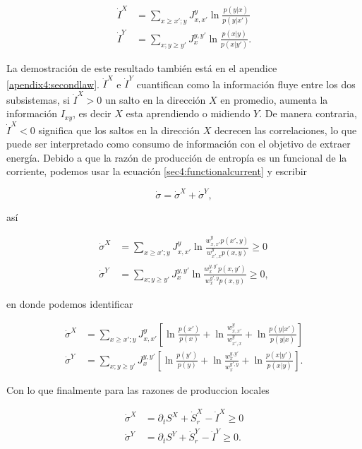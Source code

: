 \begin{align*}
    \dot{I}^{X} & = \sum_{x\geq x'; y}J_{x,x'}^{y} \ln \frac{ p(y|x) }{p(y|x')} \\
    \dot{I}^{Y} & = \sum_{x;y\geq y'} J_{x}^{y,y'} \ln \frac{p(x|y)}{ p(x|y') }.
\end{align*}

 La demostración de este resultado también está en el apendice \ref{apendix4:secondlaw}. $\dot{I}^{X}$ e $\dot{I}^{Y}$ cuantifican como la información fluye entre los dos subsistemas, si $\dot{I}^{X}>0$ un salto en la dirección $X$ en promedio, aumenta la información $I_{xy}$, es decir $X$ esta aprendiendo o midiendo $Y$. De manera contraria, $\dot{I}^{X}<0$ significa que los saltos en la dirección $X$ decrecen las correlaciones, lo que puede ser interpretado como consumo de información con el objetivo de extraer energía. Debido a que la razón de producción de entropía es un funcional de la corriente, podemos usar la ecuación \ref{sec4:functionalcurrent} y escribir

 \begin{equation*}
    \dot{\sigma} = \dot{\sigma}^{X} + \dot{\sigma}^{Y},
 \end{equation*}

así

\begin{align*}
    \dot{\sigma}^{X} & = \sum_{x \geq x';y} J_{x,x'}^{y} \ln  \frac{w_{x,x'}^{y} p(x',y) }{w_{x',x}^{y} p(x,y) } \geq 0 \\
    \dot{\sigma}^{Y} & = \sum_{x;y\geq y'}J_{x}^{y,y'} \ln \frac{w_{x}^{y,y'} p(x,y') }{ w_{x}^{y',y} p(x,y) } \geq 0, 
\end{align*}

en donde podemos identificar

\begin{align*}
    \dot{\sigma}^{X} &  = \sum_{x \geq x';y} J_{x,x'}^{y} \left[ \ln \frac{p(x')}{p(x)}  +\ln \frac{w_{x,x'}^{y}}{ w_{x',x}^{y} } + \ln \frac{p(y|x')}{p(y|x)} \right] \\
    \dot{\sigma}^{Y} &  = \sum_{x;y \geq y'} J_{x}^{y,y'} \left[ \ln \frac{p(y')}{p(y)}  + \ln \frac{w_{x}^{y,y'}}{ w_{x}^{y',y} } + \ln \frac{p(x|y')}{p(x|y)} \right].
\end{align*}

Con lo que finalmente para las razones de produccion locales

\begin{align*}
    \dot{\sigma}^{X} & = \partial_{t}S^{X} + \dot{S}_{r}^{X} - \dot{I}^{X} \geq 0 \\
    \dot{\sigma}^{Y} & = \partial_{t}S^{Y} + \dot{S}_{r}^{Y} - \dot{I}^{Y} \geq 0.
\end{align*}

